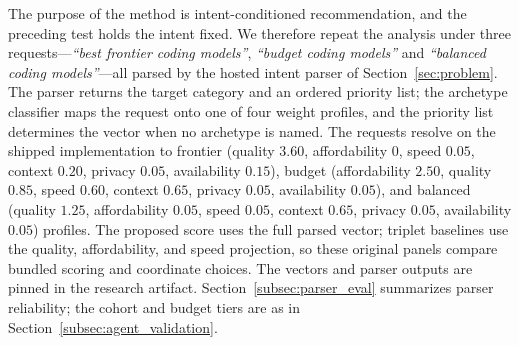 \documentclass[pdflatex,sn-mathphys-num]{sn-jnl}
\theoremstyle{thmstyleone}
\theoremstyle{thmstylethree}
\begin{document}
The purpose of the method is intent-conditioned recommendation, and the preceding test holds the intent fixed. We therefore repeat the analysis under three requests---\emph{``best frontier coding models''}, \emph{``budget coding models''} and \emph{``balanced coding models''}---all parsed by the hosted intent parser of Section~\ref{sec:problem}. The parser returns the target category and an ordered priority list; the archetype classifier maps the request onto one of four weight profiles, and the priority list determines the vector when no archetype is named. The requests resolve on the shipped implementation to frontier (quality $3.60$, affordability $0$, speed $0.05$, context $0.20$, privacy $0.05$, availability $0.15$), budget (affordability $2.50$, quality $0.85$, speed $0.60$, context $0.65$, privacy $0.05$, availability $0.05$), and balanced (quality $1.25$, affordability $0.05$, speed $0.05$, context $0.65$, privacy $0.05$, availability $0.05$) profiles. The proposed score uses the full parsed vector; triplet baselines use the quality, affordability, and speed projection, so these original panels compare bundled scoring and coordinate choices. The vectors and parser outputs are pinned in the research artifact. Section~\ref{subsec:parser_eval} summarizes parser reliability; the cohort and budget tiers are as in Section~\ref{subsec:agent_validation}.
\end{document}
